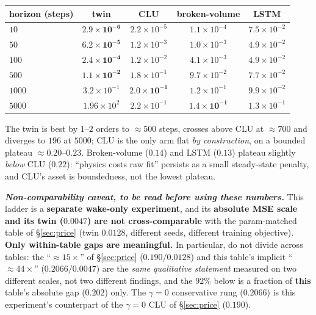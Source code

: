 \documentclass{article}
\begin{document}
\begin{center}\footnotesize
\begin{tabular}{lcccc}
\toprule
horizon (steps) & \textbf{twin} & \textbf{CLU} & broken-volume & LSTM \\
\midrule
$10$ & $\mathbf{2.9{\times}10^{-6}}$ & $2.2{\times}10^{-5}$ & $1.1{\times}10^{-4}$ & $7.5{\times}10^{-2}$ \\
$50$ & $\mathbf{6.2{\times}10^{-5}}$ & $1.2{\times}10^{-3}$ & $1.0{\times}10^{-3}$ & $4.9{\times}10^{-2}$ \\
$100$ & $\mathbf{2.4{\times}10^{-4}}$ & $1.2{\times}10^{-2}$ & $4.1{\times}10^{-3}$ & $4.9{\times}10^{-2}$ \\
$500$ & $\mathbf{1.1{\times}10^{-2}}$ & $1.8{\times}10^{-1}$ & $9.7{\times}10^{-2}$ & $7.7{\times}10^{-2}$ \\
$1000$ & $3.2{\times}10^{-1}$ & $\mathbf{2.0{\times}10^{-1}}$ & $1.2{\times}10^{-1}$ & $9.9{\times}10^{-2}$ \\
$5000$ & $1.96{\times}10^{2}$ & $2.2{\times}10^{-1}$ & $\mathbf{1.4{\times}10^{-1}}$ & $1.3{\times}10^{-1}$ \\
\bottomrule
\end{tabular}
\end{center}

The twin is best by $1$--$2$ orders to $\approx500$ steps, crosses above CLU at $\approx700$ and diverges to $196$ at $5000$; CLU is the only arm flat \emph{by construction}, on a bounded plateau $\approx0.20$--$0.23$. Broken-volume ($0.14$) and LSTM ($0.13$) plateau slightly \emph{below} CLU ($0.22$): ``physics costs raw fit'' persists as a small steady-state penalty, and CLU's asset is boundedness, not the lowest plateau.

\emph{\textbf{Non-comparability caveat, to be read before using these numbers.}} This ladder is a \textbf{separate wake-only experiment}, and its \textbf{absolute MSE scale and its twin ($0.0047$) are not cross-comparable} with the param-matched table of \S\ref{sec:price} (twin $0.0128$, different seeds, different training objective). \textbf{Only within-table gaps are meaningful.} In particular, do not divide across tables: the ``$\approx15\times$'' of \S\ref{sec:price} ($0.190/0.0128$) and this table's implicit ``$\approx44\times$'' ($0.2066/0.0047$) are the \emph{same qualitative statement} measured on two different scales, not two different findings, and the $92\%$ below is a fraction of \textbf{this} table's absolute gap ($0.202$) only. The $\gamma=0$ conservative rung ($0.2066$) is this experiment's counterpart of the $\gamma=0$ CLU of \S\ref{sec:price} ($0.190$).
\end{document}
